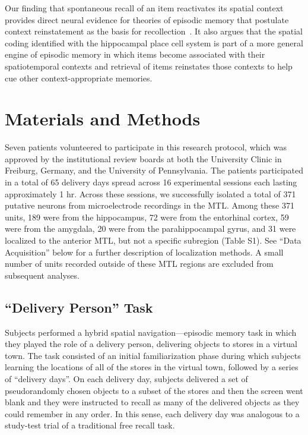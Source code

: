 Our finding that spontaneous recall of an item reactivates its spatial context provides direct neural evidence for theories of episodic memory that postulate context reinstatement as the basis for recollection~\cite{PolyKaha08,PolyEtal09}.  It also argues that the spatial coding identified with  the hippocampal place cell system is part of a more general engine of episodic memory in which items become associated with their spatiotemporal contexts and retrieval of items reinstates those contexts to help cue other context-appropriate memories.


\section{Materials and Methods}

Seven patients volunteered to participate in this research protocol, which was approved by the institutional review boards at both the University Clinic in Freiburg, Germany, and the University of Pennsylvania.  The patients participated in a total of 65 delivery days spread across 16 experimental sessions each lasting approximately 1 hr.   Across these sessions, we successfully isolated a total of 371 putative neurons from microelectrode recordings in the MTL.  Among these 371 units, 189 were from the hippocampus, 72 were from the entorhinal cortex, 59 were from the amygdala, 20 were from the parahippocampal gyrus, and 31 were localized to the anterior MTL, but not a specific subregion (Table S1). See ``Data Acquisition'' below for a further description of localization methods.  A small number of units recorded outside of these MTL regions are excluded from subsequent analyses.

\subsection*{``Delivery Person'' Task}

Subjects performed a hybrid spatial navigation---episodic memory task in which they played the role of a delivery person, delivering objects to stores in a virtual town.  The task consisted of an initial familiarization phase during which subjects learning the locations of all of the stores in the virtual town, followed by a series of ``delivery days''.  On each delivery day, subjects delivered a set of pseudorandomly chosen objects to a subset of the stores and then the screen went blank and they were instructed to recall as many of the delivered objects as they could remember in any order.  In this sense, each delivery day was analogous to a study-test trial of a traditional free recall task.

